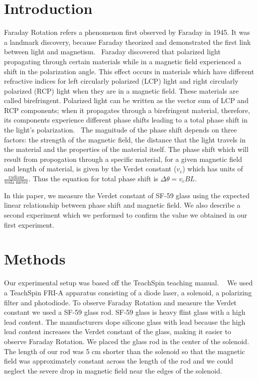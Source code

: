 \documentclass[prb,preprint]{revtex4-1}
\begin{document}
\maketitle %


\section{Introduction} %

Faraday Rotation refers a phenomenon first observed by Faraday in 1945. It was a landmark discovery, because Faraday theorized and demonstrated the first link between light and magnetism.~\cite{teachspin} Faraday discovered that polarized light propagating through certain materials while in a magnetic field experienced a shift in the polarization angle. This effect occurs in materials which have different refractive indices for left circularly polarized (LCP) light and right circularly polarized (RCP) light when they are in a magnetic field. These materials are called birefringent. Polarized light can be written as the vector sum of LCP and RCP components; when it propagates through a birefringent material, therefore, its components experience different phase shifts leading to a total phase shift in the light's polarization.~\cite{melissanos} The magnitude of the phase shift depends on three factors: the strength of the magnetic field, the distance that the light travels in the material and the properties of the material itself. The phase shift which will result from propogation through a specific material, for a given magnetic field and length of material, is given by the Verdet constant ($v_c$) which has units of $\frac{\text{radians}}{\text{tesla\ meter}}$. Thus the equation for total phase shift is $\Delta \theta = v_c B L$.

In this paper, we measure the Verdet constant of SF-59 glass using the expected linear relationship between phase shift and magnetic field. We also describe a second experiment which we performed to confirm the value we obtained in our first experiment.

\section{Methods}

Our experimental setup was based off the TeachSpin teaching manual. ~\cite{teachspin} We used a TeachSpin FRI-A apparatus consisting of a diode laser, a solenoid, a polarizing filter and photodiode. To observe Faraday Rotation and measure the Verdet constant we used a SF-59 glass rod. SF-59 glass is heavy flint glass with a high lead content. The manufacturers dope silicone glass with lead because the high lead content increases the Verdet constant of the glass, making it easier to observe Faraday Rotation.\cite{opticalglass} We placed the glass rod in the center of the solenoid. The length of our rod was 5 cm shorter than the solenoid so that the magnetic field was approximately constant across the length of the rod and we could neglect the severe drop in magnetic field near the edges of the solenoid.
\end{document}
